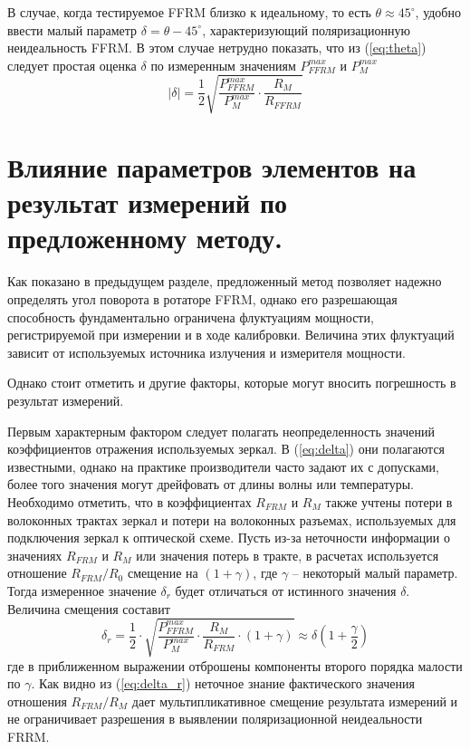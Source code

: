 \documentclass{article}
\begin{document}
В случае, когда тестируемое FFRM близко к идеальному, то есть $\theta \approx 45^\circ$, удобно ввести малый параметр $\delta = \theta - 45^\circ$, характеризующий поляризационную неидеальность FFRM.
В этом случае нетрудно показать, что из (\ref{eq:theta}) следует простая оценка $\delta$ по измеренным значениям $P_{FFRM}^{max}$ и $P_M^{max}$
\begin{equation}
    \label{eq:delta}
    |\delta| =\frac{1}{2}\sqrt{\frac{P_{FFRM}^{max}}{P_M^{max}}\cdot\frac{R_M}{R_{FFRM}}}
\end{equation}


\section{Влияние параметров элементов на результат измерений по предложенному методу.}

Как показано в предыдущем разделе, предложенный метод позволяет надежно определять угол поворота в ротаторе FFRM, однако его разрешающая способность фундаментально ограничена флуктуациям мощности, регистрируемой при измерении и в ходе калибровки.
Величина этих флуктуаций зависит от используемых источника излучения и измерителя мощности.

Однако стоит отметить и другие факторы, которые могут вносить погрешность в результат измерений.   

Первым характерным фактором следует полагать неопределенность значений коэффициентов отражения используемых зеркал.
В (\ref{eq:delta}) они полагаются известными, однако на практике производители часто задают их с допусками, более того значения могут дрейфовать от длины волны или температуры.
Необходимо отметить, что в коэффициентах $R_{FRM}$ и $R_M$ также учтены потери в волоконных трактах зеркал и потери на волоконных разъемах, используемых для подключения зеркал к оптической схеме.
Пусть из-за неточности информации о значениях $R_{FRM}$ и $R_M$ или значения потерь в тракте, в расчетах используется отношение $R_{FRM}/R_0$ смещение на $(1+\gamma)$, где $\gamma$ – некоторый малый параметр. Тогда измеренное значение $\delta_r$ будет отличаться от истинного значения $\delta$. Величина смещения составит    
\begin{equation}
    \label{eq:delta_r}
    \delta_r=\frac{1}{2}\cdot\sqrt{\frac{P_{FFRM}^{max}}{P_M^{max}}\cdot\frac{R_M}{R_{FRM}}\cdot(1+\gamma)}\approx\delta\left( 1+\frac{\gamma}{2} \right)
\end{equation}
где в приближенном выражении отброшены компоненты второго порядка малости по $\gamma$.
Как видно из (\ref{eq:delta_r}) неточное знание фактического значения отношения $R_{FRM}/R_M$ дает мультипликативное смещение результата измерений и не ограничивает разрешения в выявлении поляризационной неидеальности FRRM.
\end{document}
